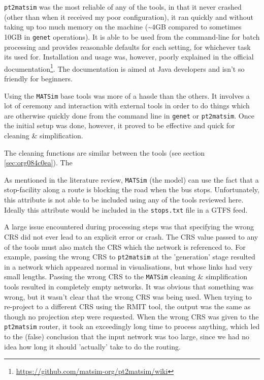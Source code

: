 \documentclass[11pt]{article}
\begin{document}
\texttt{pt2matsim} was the most reliable of any of the tools, in that it never crashed (other than when it received my poor configuration), it ran quickly and without taking up too much memory on the machine (\textasciitilde{}4GB compared to sometimes 10GB in \texttt{genet} operations). It is able to be used from the command-line for batch processing and provides reasonable defaults for each setting, for whichever task its used for. Installation and usage was, however, poorly explained in the official documentation\footnote{\url{https://github.com/matsim-org/pt2matsim/wiki}}. The documentation is aimed at Java developers and isn't so friendly for beginners.

Using the \texttt{MATSim} base tools was more of a hassle than the others. It involves a lot of ceremony and interaction with external tools in order to do things which are otherwise quickly done from the command line in \texttt{genet} or \texttt{pt2matsim}. Once the initial setup was done, however, it proved to be effective and quick for cleaning \& simplification.

The cleaning functions are similar between the tools (see section \ref{sec:org084c0ea}). The

As mentioned in the literature review, \texttt{MATSim} (the model) can use the fact that a stop-facility along a route is blocking the road when the bus stops. Unfortunately, this attribute is not able to be included using any of the tools reviewed here. Ideally this attribute would be included in the \texttt{stops.txt} file in a GTFS feed.

A large issue encountered during processing steps was that specifying the wrong CRS did not ever lead to an explicit error or crash. The CRS value passed to any of the tools must also match the CRS which the network is referenced to. For example, passing the wrong CRS to \texttt{pt2matsim} at the 'generation' stage resulted in a network which appeared normal in visualisations, but whose links had very small lengths. Passing the wrong CRS to the \texttt{MATSim} cleaning \& simplification tools resulted in completely empty networks. It was obvious that something was wrong, but it wasn't clear that the wrong CRS was being used. When trying to re-project to a different CRS using the RMIT tool, the output was the same as though no projection step were requested. When the wrong CRS was given to the \texttt{pt2matsim} router, it took an exceedingly long time to process anything, which led to the (false) conclusion that the input network was too large, since we had no idea how long it should 'actually' take to do the routing.
\end{document}
